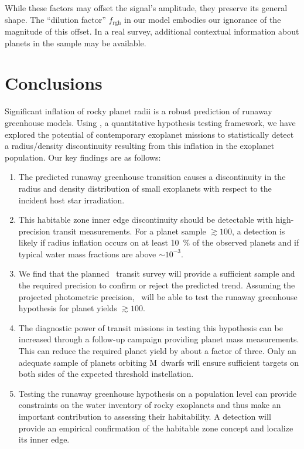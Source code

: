 \documentclass[twocolumn,twocolappendix]{aastex631}
\begin{document}
While these factors may offset the signal's amplitude, they preserve its general shape.
The ``dilution factor'' $f_\mathrm{rgh}$ in our model embodies our ignorance of the magnitude of this offset.
In a real survey, additional contextual information about planets in the sample may be available.


\section{Conclusions}\label{sec:conclusions}
Significant inflation of rocky planet radii is a robust prediction of runaway greenhouse models.
Using \bioverse, a quantitative hypothesis testing framework, we have explored the potential of contemporary exoplanet missions to statistically detect a radius/density discontinuity resulting from this inflation in the exoplanet population.
Our key findings are as follows:
\begin{enumerate}
    \item The predicted runaway greenhouse transition causes a discontinuity in the radius and density distribution of small exoplanets with respect to the incident host star irradiation.
    \item This habitable zone inner edge discontinuity should be detectable with high-precision transit measurements.
          For a planet sample $\gtrsim 100$, a detection is likely if radius inflation occurs on at least \SI{10}{\percent} of the observed planets and if typical water mass fractions are above $\sim 10^{-3}$.
    \item We find that the planned \plato\ transit survey will provide a sufficient sample and the required precision to confirm or reject the predicted trend.
          Assuming the projected photometric precision, \plato\ will be able to test the runaway greenhouse hypothesis for planet yields $\gtrsim 100$.
    \item The diagnostic power of transit missions in testing this hypothesis can be increased through a follow-up campaign providing planet mass measurements.
          This can reduce the required planet yield by about a factor of three.
          Only an adequate sample of planets orbiting M~dwarfs will ensure sufficient targets on both sides of the expected threshold instellation.
    \item Testing the runaway greenhouse hypothesis on a population level can provide constraints on the water inventory of rocky exoplanets and thus make an important contribution to assessing their habitability.
         A detection will provide an empirical confirmation of the habitable zone concept and localize its inner edge.

\end{enumerate}
\end{document}
